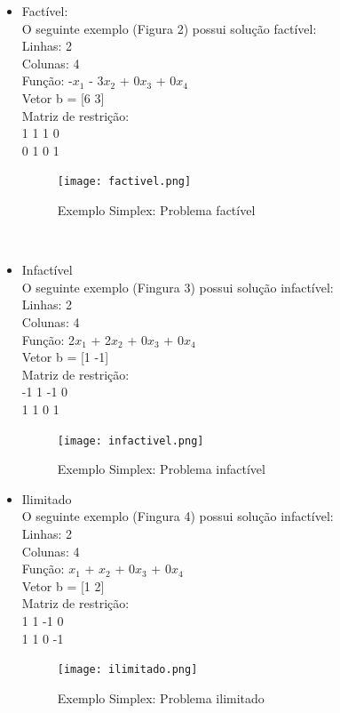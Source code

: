 \documentclass[a4paper]{article}
\begin{document}
\begin{itemize}
\item Fact\'ivel:
\\
O seguinte exemplo (Figura 2) possui solu\c{c}\~ao fact\'ivel:
\\
Linhas: 2
\\
Colunas: 4
\\
Fun\c{c}\~ao: -$x_1$ - 3$x_2$ + 0$x_3$ + 0$x_4$
\\
Vetor b = [6 3]
\\
Matriz de restri\c{c}\~ao:\\
1 1 1 0\\
0 1 0 1\\
\begin{figure}[ht!]
\label{factivel}
\caption{Exemplo Simplex: Problema fact\'ivel}
\texttt{[image: factivel.png]}
\end{figure}
\\
\item Infact\'ivel
\\
O seguinte exemplo (Fingura 3) possui solu\c{c}\~ao infact\'ivel:
\\
Linhas: 2
\\
Colunas: 4
\\
Fun\c{c}\~ao: 2$x_1$ + 2$x_2$ + 0$x_3$ + 0$x_4$
\\
Vetor b = [1 -1]
\\
Matriz de restri\c{c}\~ao:\\
-1 1 -1 0\\
1 1 0 1\\
\begin{figure}[h!]
\label{infactivel}
\caption{Exemplo Simplex: Problema infact\'ivel}
\texttt{[image: infactivel.png]}
\end{figure}
\item Ilimitado
\\
O seguinte exemplo (Fingura 4) possui solu\c{c}\~ao infact\'ivel:
\\
Linhas: 2
\\
Colunas: 4
\\
Fun\c{c}\~ao: $x_1$ + $x_2$ + 0$x_3$ + 0$x_4$
\\
Vetor b = [1 2]
\\
Matriz de restri\c{c}\~ao:\\
1 1 -1 0\\
1 1 0 -1\\
\begin{figure}[h!]
\label{ilimitado}
\caption{Exemplo Simplex: Problema ilimitado}
\texttt{[image: ilimitado.png]}
\end{figure}

\end{itemize}
\end{document}
